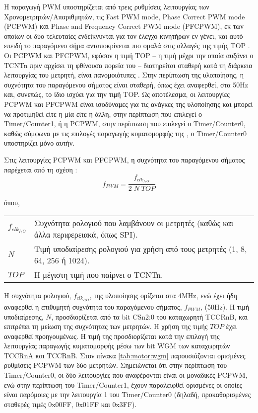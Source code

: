 Η παραγωγή PWM υποστηρίζεται από τρεις ρυθμίσεις λειτουργίας των
Χρονομετρητών\slash Απαριθμητών, τις \textenglish{Fast PWM mode, Phase Correct
PWM mode (PCPWM)} και \textenglish{Phase and Frequency Correct PWM mode
(PFCPWM)}, εκ των οποίων οι δύο τελευταίες ενδείκνυνται για τον έλεγχο κινητήρων
εν γένει, και αυτό επειδή το παραγόμενο σήμα ανταποκρίνεται πιο ομαλά στις
αλλαγές της τιμής TOP \parencite[126,128]{atmel13}. Οι PCPWM και PFCPWM, εφόσον
η τιμή TOP -- η τιμή μέχρι την οποία αυξάνει ο TCNTn πριν αρχίσει τη φθίνουσα
πορεία του -- διατηρείται σταθερή κατά τη διάρκεια λειτουργίας του μετρητή,
είναι πανομοιότυπες \parencite[127]{atmel13}. Στην περίπτωση της υλοποίησης, η
συχνότητα του παραγόμενου σήματος είναι σταθερή, όπως έχει αναφερθεί, στα 50Hz
και, συνεπώς, το ίδιο ισχύει για την τιμή TOP. Ως αποτέλεσμα, οι λειτουργίες
PCPWM και PFCPWM είναι ισοδύναμες για τις ανάγκες της υλοποίησης και μπορεί να
προτιμηθεί είτε η μία είτε η άλλη, στην περίπτωση που επιλεγεί ο
\textenglish{Timer\slash Counter1}, ή η PCPWM, στην περίπτωση που επιλεγεί ο
\textenglish{Timer\slash Counter0}, καθώς σύμφωνα με τις επιλογές παραγωγής
κυματομορφής της \textcite[107]{atmel13}, ο \textenglish{Timer\slash Counter0}
υποστηρίζει μόνο αυτήν.

Στις λειτουργίες PCPWM και PFCPWM, η συχνότητα του παραγόμενου σήματος παρέχεται
από τη σχέση \parencite[102,128,129]{atmel13}:
\begin{equation}
\label{eq:motor:f_pwm}
f_{PWM} = \frac{f_{clk_{I/O}}} {2\;N\;TOP}
\end{equation}

\noindent όπου, \\
\begin{tabu}{X[-1] @{ : }  X}
$f_{clk_{I/O}}$ & Συχνότητα ρολογιού που λαμβάνουν οι μετρητές (καθώς και
                  άλλα περιφερειακά, όπως SPI).                               \\
$N$             & Τιμή υποδιαίρεσης ρολογιού για χρήση από τους μετρητές (1,
                  8, 64, 256 ή 1024).                                         \\
$TOP$           & Η μέγιστη τιμή που παίρνει ο TCNTn.
\end{tabu}

Η συχνότητα ρολογιού, $f_{clk_{I/O}}$, της υλοποίησης ορίζεται στα 4MHz, ενώ
έχει ήδη αναφερθεί η επιθυμητή συχνότητα του παραγόμενου σήματος, $f_{PWM}$,
(50Hz). Η τιμή υποδιαίρεσης, $N$, προσδιορίζεται από τα bit CSn2:0 του
καταχωρητή TCCRnB, και επιτρέπει τη μείωση της συχνότητας των μετρητών. Η χρήση
της τιμής $TOP$ έχει αναφερθεί προηγουμένως. Η τιμή της προσδιορίζεται κατά την
επιλογή της λειτουργίας παραγωγής κυματομορφής μέσω των bit WGM των καταχωρητών
TCCRnA και TCCRnB. Στον πίνακα \ref{tab:motor:wgm} παρουσιάζονται ορισμένες
ρυθμίσεις PCPWM των δύο μετρητών. Σημειώνεται ότι στην περίπτωση του
\textenglish{Timer\slash Counter0}, οι δύο λειτουργίες που αναφέρονται είναι οι
μοναδικές PCPWM, ενώ στην περίπτωση του \textenglish{Timer\slash Counter1},
έχουν παραλειφθεί ορισμένες οι οποίες είναι παρόμοιες με την λειτουργία 1 του
\textenglish{Timer\slash Counter0} (δηλαδή, προκαθορισμένες σταθερές τιμές
0x00FF, 0x01FF και 0x3FF).

